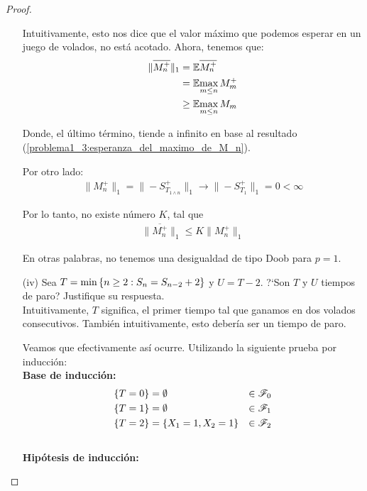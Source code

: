 \begin{proof}
\begin{enumerate}
			Intuitivamente, esto nos dice que el valor máximo que podemos esperar en un juego de volados, no está acotado.
			Ahora, tenemos que:
			\begin{align}
				\|\overline{M_{n}^{+}}\|_1  &=    \mathbb{E}{\overline{M_{n}^{+}}} \\
											&=    \mathbb{E}{\max_{m \leq n}M_m^+} \\
											&\geq \mathbb{E}{\max_{m \leq n}M_m}										
			\end{align}
				
			Donde, el último término, tiende a infinito en base al resultado 
			(\ref{problema1_3:esperanza_del_maximo_de_M_n}).

			Por otro lado:
			\begin{align}
				\|M_n^+\|_1=\|-S_{T_{1\wedge n}}^{+}\|_1  \longrightarrow  \|-S_{T_1}^+\|_1 = 0 < \infty
			\end{align}
			
			Por lo tanto, no existe número $K$, tal que
			\begin{align}
				 \|\overline{M_n^+}\|_1 \leq  K \|M_n^+\|_1
			\end{align}
			
			En otras palabras, no tenemos una desigualdad de tipo Doob para $p=1$.\\
			
		\item[(iv)]  
		Sea $T=\min\left\{ n\geq 2:S_n=S_{n-2} + 2\right\} $ y $U=T-2$. ?`Son $T$ y $U$ 
		tiempos de paro? Justifique su respuesta.\\
					
			Intuitivamente, $T$ significa, el primer tiempo tal que ganamos en dos volados consecutivos.
			También intuitivamente, esto debería ser un tiempo de paro.
			
			Veamos que efectivamente así ocurre. Utilizando la siguiente prueba por inducción:\\
			
			\textbf{Base de inducción:}		
				\begin{align}
					\{T = 0\} 		&= \emptyset  				& 	\in \mathscr{F}_0 \\
					\{T = 1\} 		&= \emptyset  				& 	\in \mathscr{F}_1 \\
			   		\{T = 2\} 		&= \{ X_1 = 1, X_2 = 1\} 	&	\in \mathscr{F}_2
				\end{align}	\\					
			
			\textbf{Hipótesis de inducción:}\\
			

\end{enumerate}
\end{proof}

